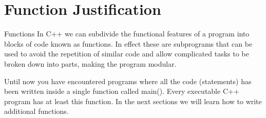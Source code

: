 \documentclass[../lecture4-functions.tex]{subfiles}
\begin{document}
\section{Function Justification}


\begin{frame}[fragile]{Functions}
    In C++ we can subdivide the functional features of a program into blocks of code known as
    functions. In effect these are subprograms that can be used to avoid the repetition of similar
    code and allow complicated tasks to be broken down into parts, making the program modular. \newline

    Until now you have encountered programs where all the code (statements) has been written inside
    a single function called main(). Every executable C++ program has at least this function. In
    the next sections we will learn how to write additional functions.
\end{frame}

\end{document}
